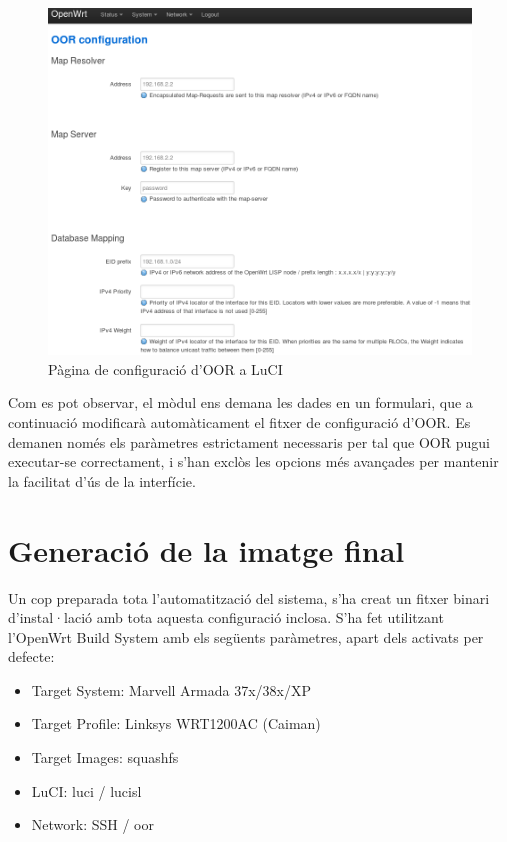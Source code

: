 \documentclass[11pt]{article}
\begin{document}
	\begin{figure}[h]
		\centering
		\includegraphics[width=15cm]{luci2}
		\caption{Pàgina de configuració d'OOR a LuCI}
	\end{figure}	

Com es pot observar, el mòdul ens demana les dades en un formulari, que a continuació modificarà automàticament el fitxer de configuració d’OOR. Es demanen només els paràmetres estrictament necessaris per tal que OOR pugui executar-se correctament, i s'han exclòs les opcions més avançades per mantenir la facilitat d'ús de la interfície.
\newpage
\section{Generació de la imatge final}
Un cop preparada tota l’automatització del sistema, s’ha creat un fitxer binari d’instal·lació amb tota aquesta configuració inclosa. S’ha fet utilitzant l’OpenWrt Build System amb els següents paràmetres, apart dels activats per defecte:
\begin{itemize}
\item Target System: Marvell Armada 37x/38x/XP
\item Target Profile: Linksys WRT1200AC (Caiman)
\item Target Images: squashfs
\item LuCI: luci / lucisl
\item Network: SSH / oor
\end{itemize}
\end{document}
